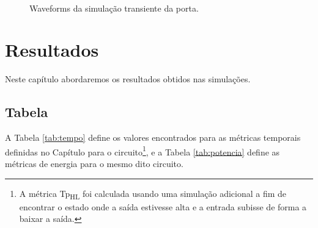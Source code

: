 \documentclass{iiufrgs}
\begin{document}
\begin{figure}[htbp]
    \centering
    \caption{Waveforms da simulação transiente da porta.}
     \\
    \label{fig:wave}
\end{figure}

\FloatBarrier

\chapter{Resultados}\label{resultados}
Neste capítulo abordaremos os resultados obtidos nas simulações.

\section{Tabela}\label{tabela}
A Tabela \ref{tab:tempo} define os valores encontrados para as métricas temporais definidas no Capítulo  para o circuito\footnote{A métrica Tp\textsubscript{HL} foi calculada usando uma simulação adicional a fim de encontrar o estado onde a saída estivesse alta e a entrada subisse de forma a baixar a saída.}, e a Tabela \ref{tab:potencia} define as métricas de energia para o mesmo dito circuito.
\end{document}
